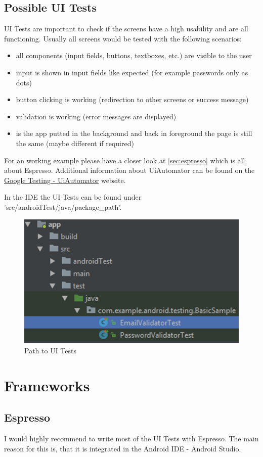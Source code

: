 	\section{Possible UI Tests}
	UI Tests are important to check if the screens have a high usability and are all functioning. Usually all screens would be tested with the following scenarios:
	\begin{itemize}
		\itemsep0pt
		\item all components (input fields, buttons, textboxes, etc.) are visible to the user
		\item input is shown in input fields like expected (for example passwords only as dots)
		\item button clicking is working (redirection to other screens or success message)
		\item validation is working (error messages are displayed)
		\item is the app putted in the background and back in foreground the page is still the same (maybe different if required)
	\end{itemize}

	For an working example please have a closer look at \autoref{sec:espresso} which is all about Espresso. Additional information about UiAutomator can be found on the \href{https://developer.android.com/training/testing/uiautomator}{Google Testing - UiAutomator} website.
	
	In the IDE the UI Tests can be found under 'src/androidTest/java/package\_path'.
	\begin{figure}[H]
		\centering
		\includegraphics[width=0.5\linewidth]{images/unit_tests_folder}
		\caption{Path to UI Tests}
		\label{fig:unittestsfolder}
	\end{figure}
	
	\chapter{Frameworks}
	\section{Espresso}
	\label{sec:espresso}
	I would highly recommend to write most of the UI Tests with Espresso. The main reason for this is, that it is integrated in the Android IDE - Android Studio.
	

